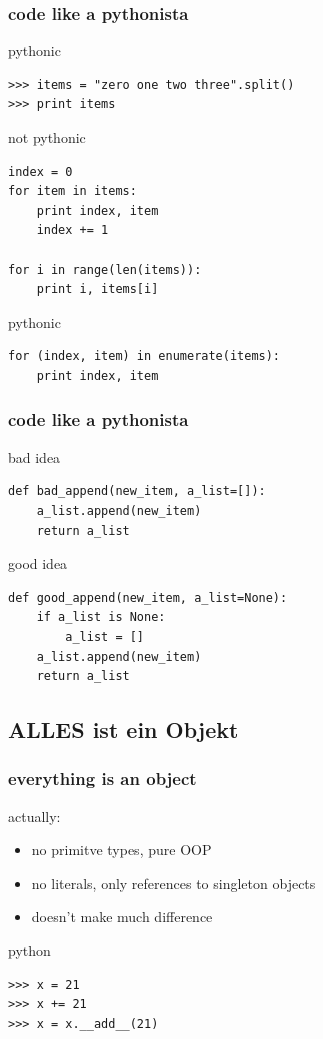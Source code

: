 \documentclass{beamer}
\begin{document}
\begin{frame}[fragile]
	\frametitle{code like a pythonista}

	\begin{exampleblock}{pythonic}
	\begin{lstlisting}
>>> items = "zero one two three".split()
>>> print items
    \end{lstlisting}
	\end{exampleblock}
  	\pause
	\begin{alertblock}{not pythonic}
	\begin{lstlisting}
index = 0
for item in items:
    print index, item
    index += 1

for i in range(len(items)):
    print i, items[i]
    \end{lstlisting}
	\end{alertblock}
  	\pause	
	\begin{exampleblock}{pythonic}
    \begin{lstlisting}
for (index, item) in enumerate(items):
    print index, item
    \end{lstlisting}
	\end{exampleblock}
\end{frame}

\begin{frame}[fragile]
	\frametitle{code like a pythonista}
	
	\begin{alertblock}{bad idea}
	\begin{lstlisting} 
def bad_append(new_item, a_list=[]):
    a_list.append(new_item)
    return a_list
    \end{lstlisting}%
	\end{alertblock}
 	\pause
	\begin{exampleblock}{good idea}
	\begin{lstlisting}
def good_append(new_item, a_list=None):
    if a_list is None:
        a_list = []
    a_list.append(new_item)
    return a_list
    \end{lstlisting}
	\end{exampleblock}
\end{frame}


\subsection{ALLES ist ein Objekt}

\begin{frame}[fragile]
	\frametitle{everything is an object}
	actually:
	\begin{itemize}
	\item no primitve types, pure OOP
	\item no literals, only references to singleton objects
	\item doesn't make much difference
	\end{itemize}
	\begin{exampleblock}{python}
	\begin{lstlisting}
>>> x = 21
>>> x += 21
>>> x = x.__add__(21)
	\end{lstlisting}
	\end{exampleblock}
\end{frame}
\end{document}
